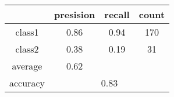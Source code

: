 
    \begin{tabular}{ | c | c | c | c | }
	\hline
	         &presision & recall & count \\ \hline
	class1   & 0.86    & 0.94  & 170 \\ \hline
	class2   & 0.38    & 0.19  & 31 \\ \hline
	average  & 0.62    &        &       \\
	\hline
	accuracy & \multicolumn{3}{c|}{0.83}\\
	\hline
    \end{tabular}